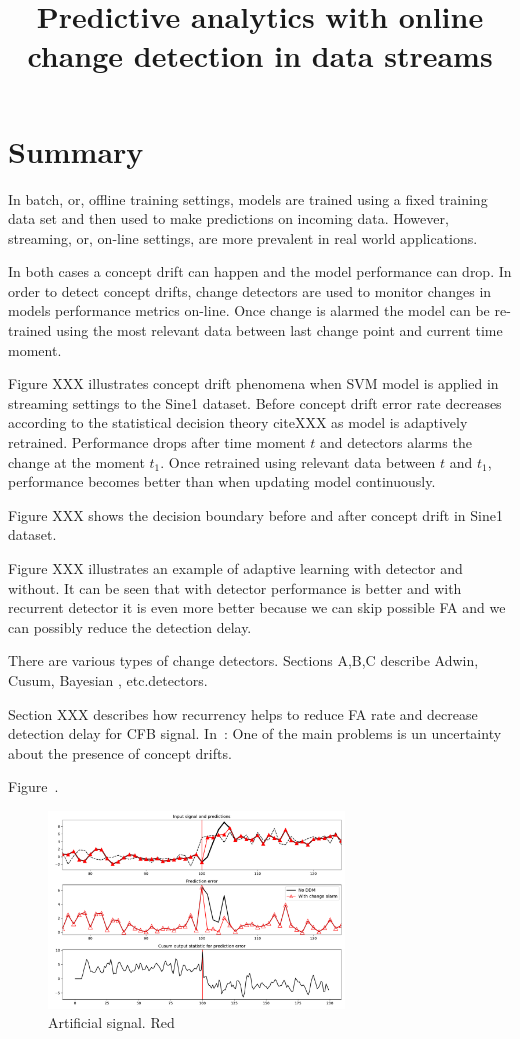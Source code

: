 \documentclass[12 pt]{article}
\title{Predictive analytics with online change detection in data streams}
\date{}
\begin{document}
	\maketitle
  \section{Summary}
  
  In batch, or, offline training settings, models are trained using a fixed training data set and then used to make predictions on incoming data. However, streaming, or, on-line settings, are more prevalent in real world applications. 

  In both cases a concept drift can happen and the model performance can drop. In order to detect concept drifts, change detectors are used to monitor changes in models performance metrics on-line. Once change is alarmed the model can be re-trained using the most relevant data between last change point and current time moment.

  Figure XXX illustrates concept drift phenomena when SVM model is applied in streaming settings to the Sine1 dataset. Before concept drift error rate decreases according to the statistical decision theory cite{XXX} as model is adaptively retrained. Performance drops after time moment $t$ and detectors alarms the change at the moment $t_1$. Once retrained using relevant data between $t$ and $t_1$, performance becomes better than when updating model continuously.

  Figure XXX shows the decision boundary before and after concept drift in Sine1 dataset.

  Figure XXX illustrates an example of adaptive learning with detector and without. It can be seen that with detector performance is better and with recurrent detector it is even more better because we can skip possible FA and we can possibly reduce the detection delay.

  There are various types of change detectors. Sections A,B,C describe Adwin, Cusum, Bayesian , etc.detectors.

  Section XXX describes how recurrency helps to reduce FA rate and decrease detection delay for CFB signal.
  In~\cite{SouzaRMB20}: One of the main problems is un uncertainty about the presence of concept drifts.


  Figure~\cite{fig:art_sig_example}.

  \begin{figure}[!htb]
    \centering
    \includegraphics[width=0.7\textwidth]{images/proof_of_concept_linreg_art_sig}
    \caption{Artificial signal. Red }\label{fig:art_sig_example}
  \end{figure}
  
  
\end{document}
